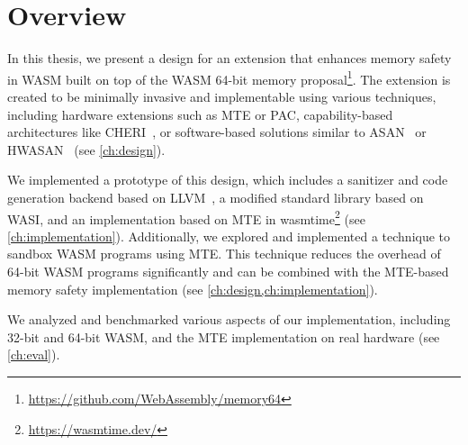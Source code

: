 \chapter{Overview}
\label{ch:overview}

In this thesis, we present a design for an extension that enhances memory safety in \ac{WASM} built on top of the \ac{WASM} 64-bit memory proposal\footnote{\url{https://github.com/WebAssembly/memory64}}.
The extension is created to be minimally invasive and implementable using various techniques, including hardware extensions such as \ac{MTE} or \ac{PAC}, capability-based architectures like \ac{CHERI}~\cite{woodruff2014cheri}, or software-based solutions similar to \ac{ASAN}~\cite{serebryany2012addresssanitizer} or \ac{HWASAN}~\cite{serebryany2018memory} (see \cref{ch:design}).

We implemented a prototype of this design, which includes a sanitizer and code generation backend based on LLVM~\cite{lattner2004llvm}, a modified standard library based on \ac{WASI}, and an implementation based on \ac{MTE} in wasmtime\footnote{\url{https://wasmtime.dev/}} (see \cref{ch:implementation}).
Additionally, we explored and implemented a technique to sandbox \ac{WASM} programs using \ac{MTE}.
This technique reduces the overhead of 64-bit \ac{WASM} programs significantly and can be combined with the \ac{MTE}-based memory safety implementation (see \cref{ch:design,ch:implementation}).

We analyzed and benchmarked various aspects of our implementation, including 32-bit and 64-bit \ac{WASM}, and the \ac{MTE} implementation on real hardware (see \cref{ch:eval}).
